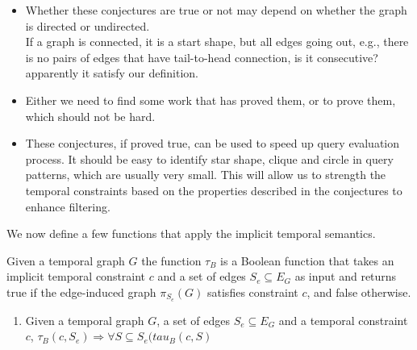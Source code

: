 \begin{itemize}
	\item Whether these conjectures are true or not may depend on whether
          the graph is directed or undirected.\\
          	If a graph is connected, it is a start shape, but all edges going out, e.g., there is no pairs of edges that have tail-to-head connection, is it consecutive? apparently it satisfy our definition. 
        
	\item Either we need to find some work that has proved them, or to prove
          them, which should not be hard.
	\item These conjectures, if proved true, can be used to speed up query
          evaluation process. It should be easy to identify star shape, clique
          and circle in query patterns, which are usually very small. This will
          allow us to strength the temporal constraints based on the properties
          described in the conjectures to enhance filtering.
\end{itemize}

We now define a few functions that apply the implicit temporal semantics. 

\begin{defn}
Given a temporal graph $G$ the function $\tau_B$ is a Boolean function that takes an implicit temporal constraint $c$ and a set of edges $S_e \subseteq E_G$  as input and returns true if the edge-induced graph $\pi_{S_e}(G)$ satisfies constraint $c$, and false otherwise.
\end{defn}

\begin{enumerate}
	\item Given a temporal graph $G$,  a set of edges $S_e \subseteq E_G$ and a temporal constraint $c$, $\tau_B(c, S_e) \Rightarrow \forall S \subseteq S_e (tau_B(c, S)$
\end{enumerate}

